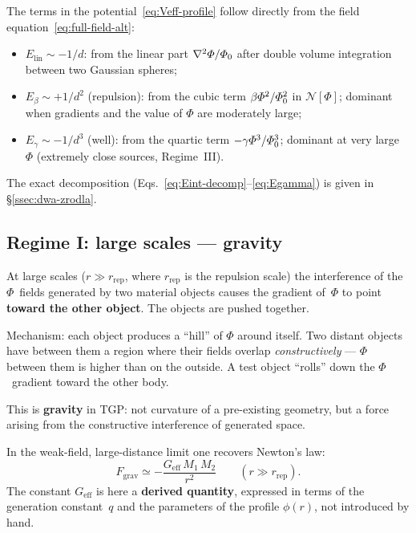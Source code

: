 \begin{remark}\label{rem:Veff-field-eq}
The terms in the potential~\eqref{eq:Veff-profile} follow directly
from the field equation~\eqref{eq:full-field-alt}:
\begin{itemize}[nosep]
  \item $E_{\mathrm{lin}} \sim -1/d$: from the linear part
    $\nabla^2\varPhi/\varPhi_0$ after double volume integration between
    two Gaussian spheres;
  \item $E_\beta \sim +1/d^2$ (repulsion): from the cubic term
    $\beta\varPhi^2/\varPhi_0^2$ in $\mathcal{N}[\Phi]$; dominant when
    gradients and the value of $\Phi$ are moderately large;
  \item $E_\gamma \sim -1/d^3$ (well): from the quartic term
    $-\gamma\varPhi^3/\varPhi_0^3$; dominant at very large $\Phi$
    (extremely close sources, Regime~III).
\end{itemize}
The exact decomposition
(Eqs.~\ref{eq:Eint-decomp}--\ref{eq:Egamma})
is given in \S\ref{ssec:dwa-zrodla}.
\end{remark}

\subsection{Regime I: large scales --- gravity}\label{ssec:grawitacja}

\begin{proposition}\label{prop:grav}
At large scales ($r \gg r_{\mathrm{rep}}$, where $r_{\mathrm{rep}}$
is the repulsion scale) the interference of the $\Phi$~fields
generated by two material objects causes the gradient of~$\Phi$ to
point \textbf{toward the other object}.  The objects are pushed
together.
\end{proposition}

Mechanism: each object produces a ``hill'' of $\Phi$ around itself.
Two distant objects have between them a region where their fields
overlap \emph{constructively} --- $\Phi$ between them is higher than
on the outside.  A test object ``rolls'' down the $\Phi$~gradient
toward the other body.

This is \textbf{gravity} in TGP: not curvature of a pre-existing
geometry, but a force arising from the constructive interference of
generated space.

In the weak-field, large-distance limit one recovers Newton's law:
\begin{equation}\label{eq:newton-limit}
    F_{\mathrm{grav}} \simeq
    -\frac{G_{\mathrm{eff}}\,M_1\,M_2}{r^2}
    \qquad (r \gg r_{\mathrm{rep}}).
\end{equation}
The constant $G_{\mathrm{eff}}$ is here a \textbf{derived quantity},
expressed in terms of the generation constant~$q$ and the parameters
of the profile $\phi(r)$, not introduced by hand.

